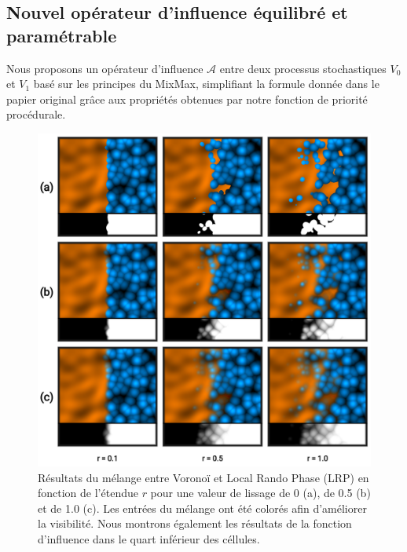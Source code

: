 \documentclass[9pt, twocolumn]{article} %
\begin{document}
\subsection{Nouvel opérateur d'influence équilibré et paramétrable}

Nous proposons un opérateur d'influence $\mathcal{A}$ entre deux processus
stochastiques $V_0$ et $V_1$ basé sur les principes du MixMax, simplifiant la
formule donnée dans le papier original \cite{mixmax} grâce aux propriétés
obtenues par notre fonction de priorité procédurale.

\begin{figure}
  \includegraphics[width=\linewidth]{figures/MixMax_Range_Smoothness_Alpha.png}
  \caption{
    Résultats du mélange entre Voronoï et Local Rando Phase (LRP) en fonction de l'étendue $r$ pour une valeur de lissage de 0 (a), de 0.5 (b) et de 1.0 (c). Les entrées du mélange ont été colorés afin d'améliorer la visibilité. Nous montrons également les résultats de la fonction d'influence dans le quart inférieur des céllules.
  }
  \label{fig::MixMax_RangeSmoothnessAlpha}
\end{figure}
\end{document}
